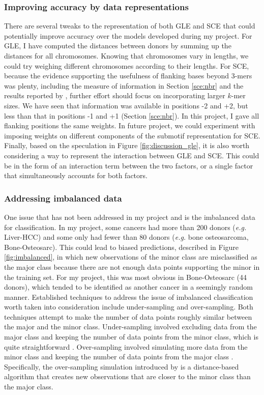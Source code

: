 \subsubsection{Improving accuracy by data representations}
There are several tweaks to the representation of both GLE and SCE that could potentially improve accuracy over the models developed during my project. For GLE, I have computed the distances between donors by summing up the distances for all chromosomes. Knowing that chromosomes vary in lengths, we could try weighing different chromosomes according to their lengths. For SCE, because the evidence supporting the usefulness of flanking bases beyond 3-mers was plenty, including the measure of information in Section \ref{sce:nbr} and the results reported by \citet{Zhang2020}, further effort should focus on incorporating larger $k$-mer sizes. We have seen that information was available in positions -2 and +2, but less than that in positions -1 and +1 (Section \ref{sce:nbr}). In this project, I gave all flanking positions the same weights. In future project, we could experiment with imposing weights on different components of the submotif representation for SCE. Finally, based on the speculation in Figure \ref{fig:discussion_gle}, it is also worth considering a way to represent the interaction between GLE and SCE. This could be in the form of an interaction term between the two factors, or a single factor that simultaneously accounts for both factors.

\subsubsection{Addressing imbalanced data}
One issue that has not been addressed in my project and \citet{Jiao2020} is the imbalanced data for classification. In my project, some cancers had more than 200 donors (\textit{e.g.} Liver-HCC) and some only had fewer than 80 donors (\textit{e.g.} bone osteosarcoma, Bone-Osteosarc). This could lead to biased predictions, described in Figure \ref{fig:imbalanced}, in which new observations of the minor class are misclassified as the major class because there are not enough data points supporting the minor in the training set. For my project, this was most obvious in Bone-Osteosarc (44 donors), which tended to be identified as another cancer in a seemingly random manner. Established techniques to address the issue of imbalanced classification worth taken into consideration include under-sampling and over-sampling. Both techniques attempt to make the number of data points roughly similar between the major and the minor class. Under-sampling involved excluding data from the major class and keeping the number of data points from the minor class, which is quite straightforward \citep{Kubat1997AddressingSelection}. Over-sampling involved simulating more data from the minor class and keeping the number of data points from the major class \citep{Chawla2002SMOTE:Technique}. Specifically, the over-sampling simulation introduced by \citet{Chawla2002SMOTE:Technique} is a distance-based algorithm that creates new observations that are closer to the minor class than the major class. 

